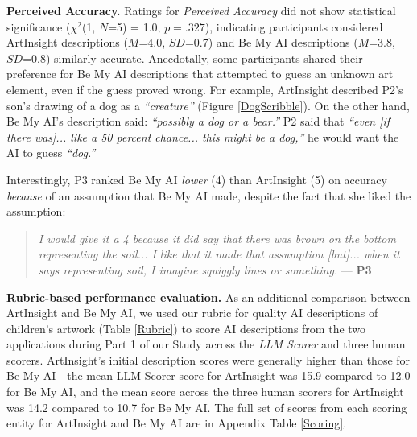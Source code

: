 \documentclass[sigconf]{acmart}
\begin{document}
\textbf{Perceived Accuracy.} Ratings for \textit{Perceived Accuracy} did not show statistical significance ($\chi^2$(1, $N$=5) = 1.0, $p=.327$), indicating participants considered ArtInsight descriptions ($M$=4.0, $SD$=0.7) and Be My AI descriptions ($M$=3.8, $SD$=0.8)  similarly accurate. Anecdotally, some participants shared their preference for Be My AI descriptions that attempted to guess an unknown art element, even if the guess proved wrong. For example, ArtInsight described P2's son's drawing of a dog as a \textit{``creature''} (Figure \ref{DogScribble}). On the other hand, Be My AI's description said: \textit{``possibly a dog or a bear.''} P2 said that \textit{``even [if there was]... like a 50 percent chance... this might be a dog,''} he would want the AI to guess \textit{``dog.''}

Interestingly, P3 ranked Be My AI \textit{lower} (4) than ArtInsight (5) on accuracy \textit{because} of an assumption that Be My AI made, despite the fact that she liked the assumption: 

\begin{quote}
    \textit{I would give it a 4 because it did say that there was brown on the bottom representing the soil... I like that it made that assumption [but]... when it says representing soil, I imagine squiggly lines or something.} --- \textbf{P3}
\end{quote}

\textbf{Rubric-based performance evaluation.} As an additional comparison between ArtInsight and Be My AI, we used our rubric for quality AI descriptions of children's artwork (Table \ref{Rubric}) to score AI descriptions from the two applications during Part 1 of our Study across the \textit{LLM Scorer} and three human scorers. ArtInsight's initial description scores were generally higher than those for Be My AI---the mean LLM Scorer score for ArtInsight was 15.9 compared to 12.0 for Be My AI, and the mean score across the three human scorers for ArtInsight was 14.2 compared to 10.7 for Be My AI. The full set of scores from each scoring entity for ArtInsight and Be My AI are in Appendix Table \ref{Scoring}.
\end{document}
